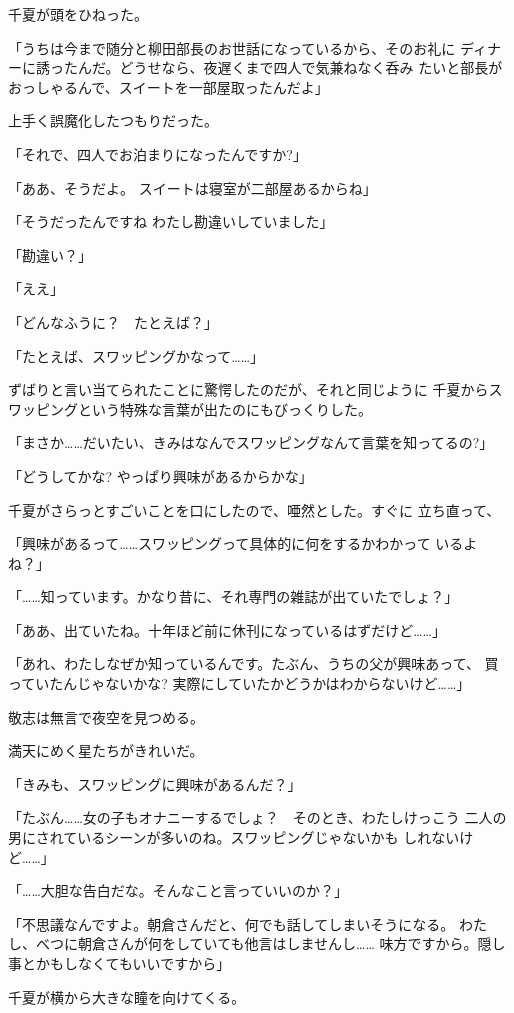 ﻿\documentclass[
    book,tate,
    line_length=30zw,
    jafontsize=12pt,
    paper=b5j,
    landscape,
    ]{jlreq}
\begin{document}
千夏が頭をひねった。

「うちは今まで随分と柳田部長のお世話になっているから、そのお礼に
ディナーに誘ったんだ。どうせなら、夜遅くまで四人で気兼ねなく呑み
たいと部長がおっしゃるんで、スイートを一部屋取ったんだよ」

上手く誤魔化したつもりだった。

「それで、四人でお泊まりになったんですか?」

「ああ、そうだよ。 スイートは寝室が二部屋あるからね」

「そうだったんですね わたし勘違いしていました」

「勘違い？」

「ええ」

「どんなふうに？　たとえば？」

「たとえば、スワッピングかなって……」

ずばりと言い当てられたことに驚愕したのだが、それと同じように
千夏からスワッピングという特殊な言葉が出たのにもびっくりした。

「まさか……だいたい、きみはなんでスワッピングなんて言葉を知ってるの?」

「どうしてかな? やっぱり興味があるからかな」

千夏がさらっとすごいことを口にしたので、唖然とした。すぐに
立ち直って、

「興味があるって……スワッピングって具体的に何をするかわかって
いるよね？」

「……知っています。かなり昔に、それ専門の雑誌が出ていたでしょ？」

「ああ、出ていたね。十年ほど前に休刊になっているはずだけど……」

「あれ、わたしなぜか知っているんです。たぶん、うちの父が興味あって、
買っていたんじゃないかな? 実際にしていたかどうかはわからないけど……」

敬志は無言で夜空を見つめる。

満天にめく星たちがきれいだ。

「きみも、スワッピングに興味があるんだ？」

「たぶん……女の子もオナニーするでしょ？　そのとき、わたしけっこう
二人の男にされているシーンが多いのね。スワッピングじゃないかも
しれないけど……」

「……大胆な告白だな。そんなこと言っていいのか？」

「不思議なんですよ。朝倉さんだと、何でも話してしまいそうになる。
わたし、べつに朝倉さんが何をしていても他言はしませんし……
味方ですから。隠し事とかもしなくてもいいですから」

千夏が横から大きな瞳を向けてくる。
\end{document}

